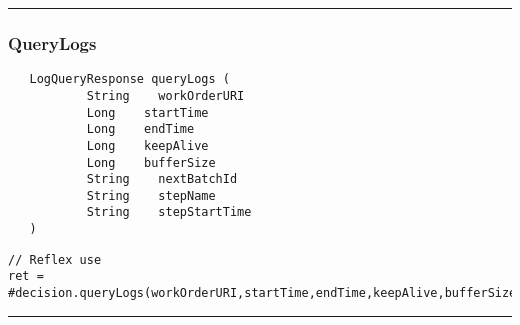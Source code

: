 \rule{15cm}{2pt}
\subsubsection{QueryLogs}
\label{Api:QueryLogs}
\begin{verbatim}
   LogQueryResponse queryLogs (
           String    workOrderURI
           Long    startTime
           Long    endTime
           Long    keepAlive
           Long    bufferSize
           String    nextBatchId
           String    stepName
           String    stepStartTime
   )
\end{verbatim}
\begin{lstlisting}[language=reflex]
// Reflex use
ret = #decision.queryLogs(workOrderURI,startTime,endTime,keepAlive,bufferSize,nextBatchId,stepName,stepStartTime);
\end{lstlisting}



\rule{15cm}{2pt}
